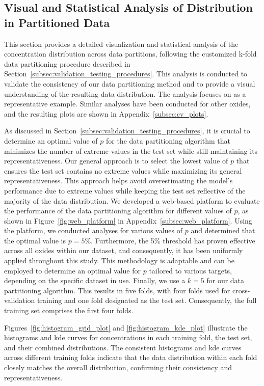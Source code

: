 \subsection{Visual and Statistical Analysis of  Distribution in Partitioned Data}\label{sec:visual_analysis}
This section provides a detailed visualization and statistical analysis of the  concentration distribution across data partitions, following the customized k-fold data partitioning procedure described in Section~\ref{subsec:validation_testing_procedures}.
This analysis is conducted to validate the consistency of our data partitioning method and to provide a visual understanding of the resulting data distribution.
The analysis focuses on  as a representative example.
Similar analyses have been conducted for other oxides, and the resulting plots are shown in Appendix~\ref{subsec:cv_plots}.

As discussed in Section~\ref{subsec:validation_testing_procedures}, it is crucial to determine an optimal value of $p$ for the data partitioning algorithm that minimizes the number of extreme values in the test set while still maintaining its representativeness.
Our general approach is to select the lowest value of $p$ that ensures the test set contains no extreme values while maximizing its general representativeness.
This approach helps avoid overestimating the model's performance due to extreme values while keeping the test set reflective of the majority of the data distribution.
We developed a web-based platform to evaluate the performance of the data partitioning algorithm for different values of $p$, as shown in Figure~\ref{fig:web_platform} in Appendix~\ref{subsec:web_platform}.
Using the platform, we conducted analyses for various values of $p$ and determined that the optimal value is $p=5\%$.
Furthermore, the 5\% threshold has proven effective across all oxides within our dataset, and consequently, it has been uniformly applied throughout this study.
This methodology is adaptable and can be employed to determine an optimal value for $p$ tailored to various targets, depending on the specific dataset in use.
Finally, we use a $k=5$ for our data partitioning algorithm.
This results in five folds, with four folds used for cross-validation training and one fold designated as the test set.
Consequently, the full training set comprises the first four folds.

Figures~\ref{fig:histogram_grid_plot} and \ref{fig:histogram_kde_plot} illustrate the histograms and \gls{kde} curves for  concentrations in each training fold, the test set, and their combined distributions.
The consistent histograms and \gls{kde} curves across different training folds indicate that the data distribution within each fold closely matches the overall distribution, confirming their consistency and representativeness.

